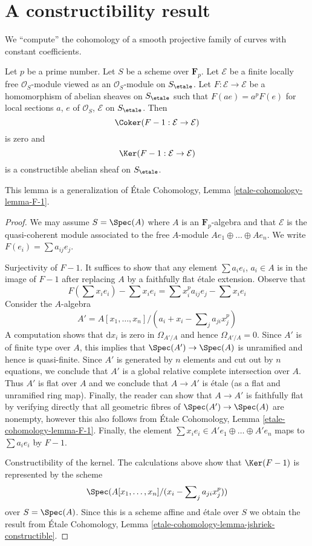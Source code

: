 \section{A constructibility result}
\label{section-family-smooth-curves-cohomology}

\noindent
We ``compute'' the cohomology of a smooth projective
family of curves with constant coefficients.

\begin{lemma}
\label{lemma-frobenius-linear-on-vb}
Let $p$ be a prime number. Let $S$ be a scheme over $\mathbf{F}_p$.
Let $\mathcal{E}$ be a finite locally free
$\mathcal{O}_S$-module viewed as an $\mathcal{O}_S$-module on $S_\etale$.
Let $F : \mathcal{E} \to \mathcal{E}$ be a homomorphism of abelian sheaves
on $S_\etale$ such that $F(a e) = a^pF(e)$ for local sections $a$, $e$
of $\mathcal{O}_S$, $\mathcal{E}$ on $S_\etale$. Then
$$
\Coker(F - 1 : \mathcal{E} \to \mathcal{E})
$$
is zero and
$$
\Ker(F - 1 : \mathcal{E} \to \mathcal{E})
$$
is a constructible abelian sheaf on $S_\etale$.
\end{lemma}

\noindent
This lemma is a generalization of \'Etale Cohomology, Lemma
\ref{etale-cohomology-lemma-F-1}.

\begin{proof}
We may assume $S = \Spec(A)$ where $A$ is an $\mathbf{F}_p$-algebra
and that $\mathcal{E}$ is the quasi-coherent module associated
to the free $A$-module $Ae_1 \oplus \ldots \oplus Ae_n$.
We write $F(e_i) = \sum a_{ij} e_j$.

\medskip\noindent
Surjectivity of $F - 1$. It suffices to show that any element
$\sum a_i e_i$, $a_i \in A$ is in the image of $F - 1$
after replacing $A$ by a faithfully flat \'etale extension.
Observe that
$$
F(\sum x_ie_i) - \sum x_i e_i = \sum x_i^p a_{ij} e_j - \sum x_i e_i
$$
Consider the $A$-algebra
$$
A' = A[x_1, \ldots, x_n]/(a_i + x_i - \sum\nolimits_j a_{ji} x_j^p)
$$
A computation shows that $\text{d}x_i$ is zero in $\Omega_{A'/A}$
and hence $\Omega_{A'/A} = 0$. Since $A'$ is of finite type over
$A$, this implies that $\Spec(A') \to \Spec(A)$ is unramified
and hence is quasi-finite. Since $A'$ is generated by $n$ elements
and cut out by $n$ equations, we conclude that $A'$
is a global relative complete intersection over $A$.
Thus $A'$ is flat over $A$ and we conclude that $A \to A'$
is \'etale (as a flat and unramified ring map). Finally,
the reader can show that $A \to A'$ is faithfully flat
by verifying directly that all geometric fibres of
$\Spec(A') \to \Spec(A)$ are nonempty, however this also
follows from \'Etale Cohomology, Lemma
\ref{etale-cohomology-lemma-F-1}.
Finally, the element $\sum x_i e_i \in A'e_1 \oplus \ldots \oplus A'e_n$
maps to $\sum a_i e_i$ by $F - 1$.

\medskip\noindent
Constructibility of the kernel. The calculations above show that
$\Ker(F - 1)$ is represented by the scheme
$$
\Spec(A[x_1, \ldots, x_n]/(x_i - \sum\nolimits_j a_{ji} x_j^p))
$$
over $S = \Spec(A)$. Since this is a scheme affine and \'etale
over $S$ we obtain the result from
\'Etale Cohomology, Lemma \ref{etale-cohomology-lemma-jshriek-constructible}.
\end{proof}

